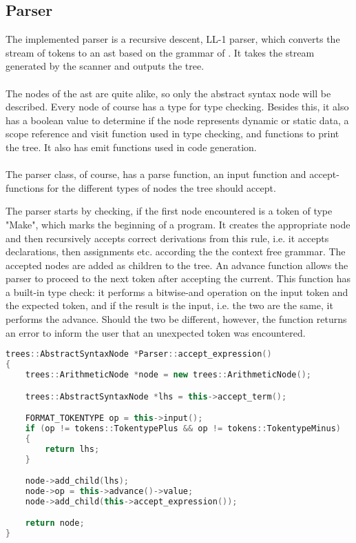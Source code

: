 \subsection{Parser}
The implemented parser is a recursive descent, LL-1 parser, which converts the stream of tokens to an \ac{ast} based on the grammar of \langname{}. It takes the stream generated by the scanner and outputs the tree.
\\
\\
The nodes of the \ac{ast} are quite alike, so only the abstract syntax node will be described. Every node of course has a type for type checking. Besides this, it also has a boolean value to determine if the node represents dynamic or static data, a scope reference and visit function used in type checking, and functions to print the tree. It also has emit functions used in code generation.
\\
\\
The parser class, of course, has a parse function, an input function and accept-functions for the different types of nodes the tree should accept.

The parser starts by checking, if the first node encountered is a token of type "Make", which marks the beginning of a program. It creates the appropriate node and then recursively accepts correct derivations from this rule, i.e. it accepts declarations, then assignments etc. according the the context free grammar. The accepted nodes are added as children to the tree. An advance function allows the parser to proceed to the next token after accepting the current. This function has a built-in type check: it performs a bitwise-and operation on the input token and the expected token, and if the result is the input, i.e. the two are the same, it performs the advance. Should the two be different, however, the function returns an error to inform the user that an unexpected token was encountered.

\begin{lstlisting}[language = c++]
trees::AbstractSyntaxNode *Parser::accept_expression()
{
	trees::ArithmeticNode *node = new trees::ArithmeticNode();

	trees::AbstractSyntaxNode *lhs = this->accept_term();

	FORMAT_TOKENTYPE op = this->input();
	if (op != tokens::TokentypePlus && op != tokens::TokentypeMinus)
	{
		return lhs;
	}

	node->add_child(lhs);
	node->op = this->advance()->value;
	node->add_child(this->accept_expression());

	return node;
}
\end{lstlisting}

